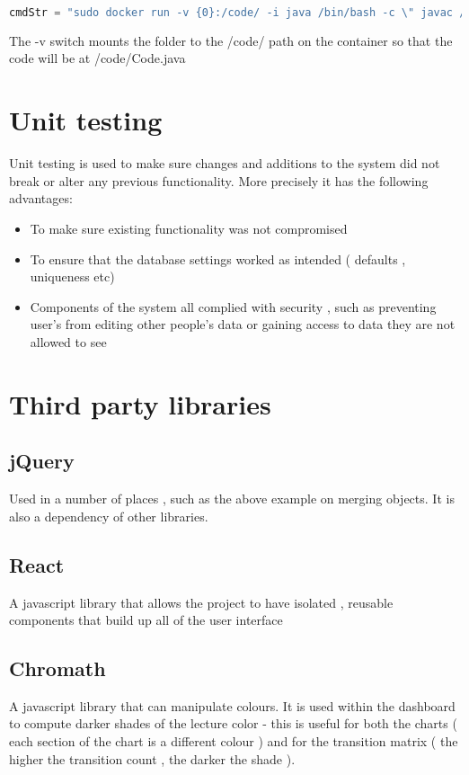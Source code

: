 \begin{lstlisting}[breaklines,language=Typescript,frame=single,basicstyle=\ttfamily,
    stringstyle=\color{red},showstringspaces=false,
    keywordstyle=\color{blue}]
cmdStr = "sudo docker run -v {0}:/code/ -i java /bin/bash -c \" javac /code/Code.java;cd /code/;java Code\"".format(folder)
\end{lstlisting}

The -v switch mounts the folder to the /code/ path on the container so that the code will be at /code/Code.java



\section{Unit testing}
Unit testing is used to make sure changes and additions to the system did not break or alter any previous functionality. More precisely it has the following advantages:
\begin{itemize}
	\item To make sure existing functionality was not compromised
	\item To ensure that the database settings worked as intended ( defaults , uniqueness etc)
	\item Components of the system all complied with security , such as preventing user's from editing other people's data or gaining access to data they are not allowed to see
\end{itemize}




\section{Third party libraries} \label{libs}

\subsection{jQuery}
Used in a number of places , such as the above example on merging objects. It is also a dependency of other libraries.

\subsection{React}
A javascript library that allows the project to have isolated , reusable components that build up all of the user interface

\subsection{Chromath} 
A javascript library that can manipulate colours. It is used within the dashboard to compute darker shades of the lecture color - this is useful for both the charts ( each section of the chart is a different colour ) and for the transition matrix ( the higher the transition count , the darker the shade ).

